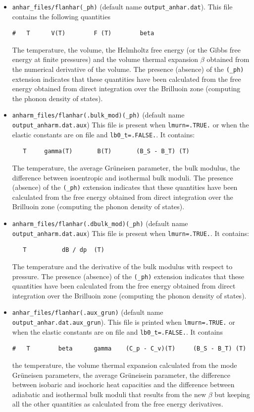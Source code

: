 \documentclass[12pt,a4paper]{article}
\begin{document}
\begin{itemize}
\item 
\texttt{anhar\_files/flanhar(\_ph)} (default name \texttt{output\_anhar.dat}).
This file contains the following quantities
\begin{verbatim}
#   T      V(T)        F (T)        beta 
\end{verbatim}
The temperature, the volume, the Helmholtz free energy (or the Gibbs free
energy at finite pressures) and the volume
thermal expansion $\beta$ obtained from the numerical derivative of the
volume. 
The presence (absence) of the \texttt{(\_ph)} extension indicates that
these quantities have been calculated from the free energy obtained from 
direct integration over the Brilluoin zone (computing the phonon density
of states). 

\item \texttt{anharm\_files/flanhar(.bulk\_mod)(\_ph)} 
(default name \texttt{output\_anharm.dat.aux})
This file is present when \texttt{lmurn=.TRUE.} or when the elastic
constants are on file and \texttt{lb0\_t=.FALSE.}. It contains:
\begin{verbatim}
   T     gamma(T)       B(T)       (B_S - B_T) (T) 
\end{verbatim}
The temperature, the average Gr\"uneisen parameter, the bulk modulus, 
the difference between isoentropic and isothermal bulk moduli.
The presence (absence) of the \texttt{(\_ph)} extension indicates that
these quantities have been calculated from the free energy obtained from 
direct integration over the Brilluoin zone (computing the phonon density
of states). 

\item \texttt{anharm\_files/flanhar(.dbulk\_mod)(\_ph)} 
(default name \texttt{output\_anharm.dat.aux})
This file is present when \texttt{lmurn=.TRUE.}. It contains:
\begin{verbatim}
   T          dB / dp  (T)  
\end{verbatim}
The temperature and the derivative of the bulk modulus with respect 
to pressure. 
The presence (absence) of the \texttt{(\_ph)} extension indicates that these 
quantities have been calculated from the free energy obtained from direct 
integration over the Brilluoin zone (computing the phonon density of states). 

\item 
\texttt{anhar\_files/flanhar(.aux\_grun)} 
(default name \texttt{output\_anhar.dat.aux\_grun}). This file is printed
when \texttt{lmurn=.TRUE.} or when the elastic
constants are on file and \texttt{lb0\_t=.FALSE.}. It contains
\begin{verbatim}
#   T        beta      gamma    (C_p - C_v)(T)     (B_S - B_T) (T)
\end{verbatim}
the temperature, the volume thermal expansion calculated from the mode 
Gr\"uneisen parameters, the average Gr\"uneisein parameter, the difference
between isobaric and isochoric heat capacities and the difference between
adiabatic and isothermal bulk moduli that results
from the new $\beta$ but keeping all the other quantities as calculated
from the free energy derivatives. 


\end{itemize}
\end{document}
